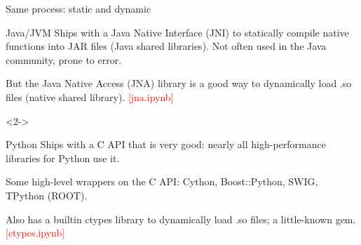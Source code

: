 \documentclass{beamer}
\begin{document}
\begin{frame}{Same process: static and dynamic}
\vspace{0.25 cm}
\begin{block}{Java/JVM}
Ships with a Java Native Interface (JNI) to statically compile native functions into JAR files (Java shared libraries). Not often used in the Java community, prone to error.

\vspace{0.25 cm}
But the Java Native Access (JNA) library is a good way to dynamically load .so files (native shared library). \hfill \textcolor{red}{[jna.ipynb]}
\end{block}

\begin{uncoverenv}<2->
\begin{block}{Python}
Ships with a C API that is very good: nearly all high-performance libraries for Python use it.

\vspace{0.25 cm}
Some high-level wrappers on the C API: Cython, Boost::Python, SWIG, TPython (ROOT).

\vspace{0.25 cm}
Also has a builtin ctypes library to dynamically load .so files; a little-known gem. \hfill \textcolor{red}{[ctypes.ipynb]}
\end{block}
\end{uncoverenv}
\end{frame}
\end{document}
